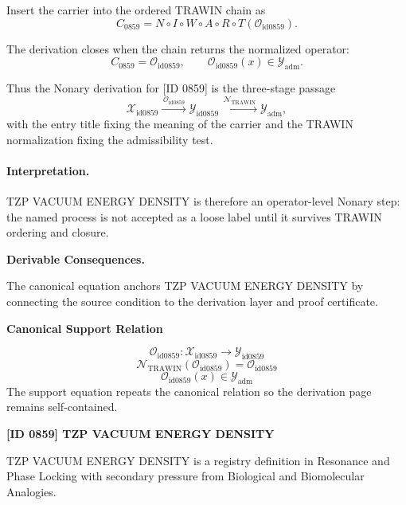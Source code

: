 Insert the carrier into the ordered TRAWIN chain as\[
C_{0859}=N\circ I\circ W\circ A\circ R\circ T(\mathcal{O}_{\mathrm{id0859}}).
\]

The derivation closes when the chain returns the normalized operator:\[
C_{0859}=\mathcal{O}_{\mathrm{id0859}},\qquad \mathcal{O}_{\mathrm{id0859}}(x)\in\mathcal{Y}_{\mathrm{adm}}.
\]

Thus the Nonary derivation for [ID 0859] is the three-stage passage
\[
\mathcal{X}_{\mathrm{id0859}}\xrightarrow{\,\mathcal{O}_{\mathrm{id0859}}\,} \mathcal{Y}_{\mathrm{id0859}}\xrightarrow{\,\mathcal{N}_{\mathrm{TRAWIN}}\,} \mathcal{Y}_{\mathrm{adm}},
\]
with the entry title fixing the meaning of the carrier and the TRAWIN normalization fixing the admissibility test.

\paragraph{Interpretation.} TZP VACUUM ENERGY DENSITY is therefore an operator-level Nonary step: the named process is not accepted as a loose label until it survives TRAWIN ordering and closure.

\par\vspace{0.35em}
\noindent\textbf{Derivable Consequences.}\quad
\begingroup
\footnotesize
\raggedright
The canonical equation anchors TZP VACUUM ENERGY DENSITY by connecting the source condition to the derivation layer and proof certificate.
\par\endgroup

\noindent\textbf{Canonical Support Relation}\par
\[
\mathcal{O}_{\mathrm{id0859}}:\mathcal{X}_{\mathrm{id0859}}\longrightarrow\mathcal{Y}_{\mathrm{id0859}}
\]
\[
\mathcal{N}_{\mathrm{TRAWIN}}(\mathcal{O}_{\mathrm{id0859}})=\mathcal{O}_{\mathrm{id0859}}
\]
\[
\mathcal{O}_{\mathrm{id0859}}(x)\in\mathcal{Y}_{\mathrm{adm}}
\]
\noindent The support equation repeats the canonical relation so the derivation page remains self-contained.\par

\clearpage
\noindent\textbf{[ID 0859] TZP VACUUM ENERGY DENSITY}\par
\vspace{0.35em}
\begingroup\small
{}
TZP VACUUM ENERGY DENSITY is a registry definition in Resonance and Phase Locking with secondary pressure from Biological and Biomolecular Analogies.

